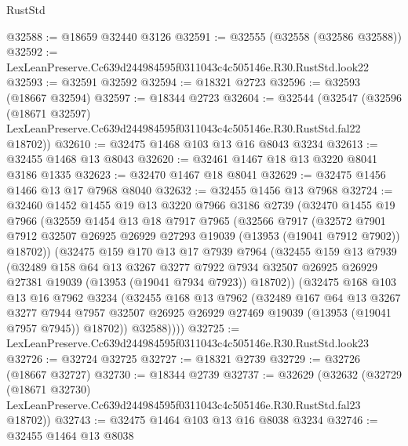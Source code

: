 \begin{lexlean}{RustStd}
\begin{coremodule}
@32588 := @18659 @32440 @3126
@32591 := @32555 (@32558 (@32586 @32588))
@32592 := LexLeanPreserve.Cc639d244984595f0311043c4c505146e.R30.RustStd.look22
@32593 := @32591 @32592
@32594 := @18321 @2723
@32596 := @32593 (@18667 @32594)
@32597 := @18344 @2723
@32604 := @32544
    (@32547
      (@32596
        (@18671 @32597)
        LexLeanPreserve.Cc639d244984595f0311043c4c505146e.R30.RustStd.fal22
        @18702))
@32610 := @32475 @1468 @103 @13 @16 @8043 @3234
@32613 := @32455 @1468 @13 @8043
@32620 := @32461 @1467 @18 @13 @3220 @8041 @3186 @1335
@32623 := @32470 @1467 @18 @8041
@32629 := @32475 @1456 @1466 @13 @17 @7968 @8040
@32632 := @32455 @1456 @13 @7968
@32724 := @32460
    @1452
    @1455
    @19
    @13
    @3220
    @7966
    @3186
    @2739
    (@32470
      @1455
      @19
      @7966
      (@32559
        @1454
        @13
        @18
        @7917
        @7965
        (@32566
          @7917
          (@32572
            @7901
            @7912
            @32507
            @26925
            @26929
            @27293
            @19039
            (@13953 (@19041 @7912 @7902))
            @18702))
        (@32475
          @159
          @170
          @13
          @17
          @7939
          @7964
          (@32455
            @159
            @13
            @7939
            (@32489
              @158
              @64
              @13
              @3267
              @3277
              @7922
              @7934
              @32507
              @26925
              @26929
              @27381
              @19039
              (@13953 (@19041 @7934 @7923))
              @18702))
          (@32475
            @168
            @103
            @13
            @16
            @7962
            @3234
            (@32455
              @168
              @13
              @7962
              (@32489
                @167
                @64
                @13
                @3267
                @3277
                @7944
                @7957
                @32507
                @26925
                @26929
                @27469
                @19039
                (@13953 (@19041 @7957 @7945))
                @18702))
            @32588))))
@32725 := LexLeanPreserve.Cc639d244984595f0311043c4c505146e.R30.RustStd.look23
@32726 := @32724 @32725
@32727 := @18321 @2739
@32729 := @32726 (@18667 @32727)
@32730 := @18344 @2739
@32737 := @32629
    (@32632
      (@32729
        (@18671 @32730)
        LexLeanPreserve.Cc639d244984595f0311043c4c505146e.R30.RustStd.fal23
        @18702))
@32743 := @32475 @1464 @103 @13 @16 @8038 @3234
@32746 := @32455 @1464 @13 @8038

\end{coremodule}
\end{lexlean}
